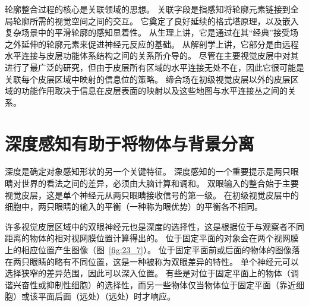 轮廓整合过程的核心是关联领域的思想。
关联字段是指感知将轮廓元素链接到全局轮廓所需的视觉空间之间的交互。
它奠定了良好延续的格式塔原理，以及嵌入复杂场景中的平滑轮廓的感知显着性。
从生理上讲，它是通过在其“经典”接受场之外延伸的轮廓元素来促进神经元反应的基础。
从解剖学上讲，它部分是由远程水平连接与皮层功能体系结构之间的关系所介导的。
尽管在主要视觉皮层中对其进行了最广泛的研究，但由于皮层所有区域的水平连接无处不在，因此它很可能是关联每个皮层区域中映射的信息位的策略。
缔合场在初级视觉皮层以外的皮层区域的功能作用取决于信息在皮层表面的映射以及这些地图与水平连接丛之间的关系。



\section{深度感知有助于将物体与背景分离}

深度是确定对象感知形状的另一个关键特征。
深度感知的一个重要提示是两只眼睛对世界的看法之间的差异，必须由大脑计算和调和。
双眼输入的整合始于主要视觉皮层，这是单个神经元从两只眼睛接收信号的第一级。
在初级视觉皮层中的细胞中，两只眼睛的输入的平衡（一种称为眼优势）的平衡各不相同。


许多视觉皮层区域中的双眼神经元也是深度的选择性，这是根据位于与观察者不同距离的物体的相对视网膜位置计算得出的。
位于固定平面的对象会在两个视网膜上的相应位置产生图像（图~\ref{fig:23_7}）。
位于固定平面前或后面的物体的图像落在两只眼睛的略有不同位置，这是一种被称为双眼差异的特性。
单个神经元可以选择狭窄的差异范围，因此可以深入位置。
有些是对位于固定平面上的物体（调谐兴奋性或抑制性细胞）的选择性，而另一些物体仅当物体位于固定平面（靠近细胞）或该平面后面（远处）（远处）时才响应。



